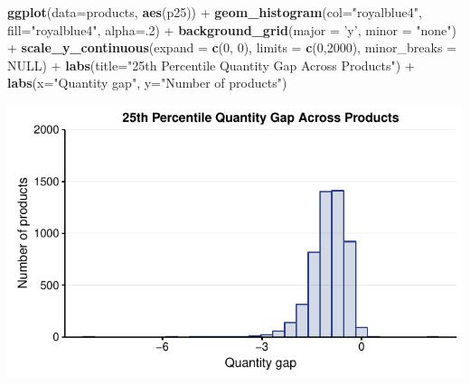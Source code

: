 \documentclass[10pt,]{article}
\newenvironment{Shaded}{\begin{snugshade}}{\end{snugshade}}
\newcommand{\KeywordTok}[1]{\textcolor[rgb]{0.13,0.29,0.53}{\textbf{{#1}}}}
\newcommand{\DataTypeTok}[1]{\textcolor[rgb]{0.13,0.29,0.53}{{#1}}}
\newcommand{\DecValTok}[1]{\textcolor[rgb]{0.00,0.00,0.81}{{#1}}}
\newcommand{\StringTok}[1]{\textcolor[rgb]{0.31,0.60,0.02}{{#1}}}
\newcommand{\OtherTok}[1]{\textcolor[rgb]{0.56,0.35,0.01}{{#1}}}
\newcommand{\NormalTok}[1]{{#1}}
\begin{document}
\begin{Shaded}
\begin{Highlighting}[]
\KeywordTok{ggplot}\NormalTok{(}\DataTypeTok{data=}\NormalTok{products, }\KeywordTok{aes}\NormalTok{(p25)) +}
\StringTok{  }\KeywordTok{geom_histogram}\NormalTok{(}\DataTypeTok{col=}\StringTok{"royalblue4"}\NormalTok{,}
                 \DataTypeTok{fill=}\StringTok{"royalblue4"}\NormalTok{,}
                 \DataTypeTok{alpha=}\NormalTok{.}\DecValTok{2}\NormalTok{) +}
\StringTok{  }\KeywordTok{background_grid}\NormalTok{(}\DataTypeTok{major =} \StringTok{'y'}\NormalTok{, }\DataTypeTok{minor =} \StringTok{"none"}\NormalTok{) +}
\StringTok{  }\KeywordTok{scale_y_continuous}\NormalTok{(}\DataTypeTok{expand =} \KeywordTok{c}\NormalTok{(}\DecValTok{0}\NormalTok{, }\DecValTok{0}\NormalTok{), }\DataTypeTok{limits =} \KeywordTok{c}\NormalTok{(}\DecValTok{0}\NormalTok{,}\DecValTok{2000}\NormalTok{),  }\DataTypeTok{minor_breaks =} \OtherTok{NULL}\NormalTok{) +}
\StringTok{  }\KeywordTok{labs}\NormalTok{(}\DataTypeTok{title=}\StringTok{"25th Percentile Quantity Gap Across Products"}\NormalTok{) +}
\StringTok{  }\KeywordTok{labs}\NormalTok{(}\DataTypeTok{x=}\StringTok{"Quantity gap"}\NormalTok{, }\DataTypeTok{y=}\StringTok{"Number of products"}\NormalTok{)}
\end{Highlighting}
\end{Shaded}

\begin{center}\includegraphics{Figs/qty_summary-4} \end{center}
\end{document}
